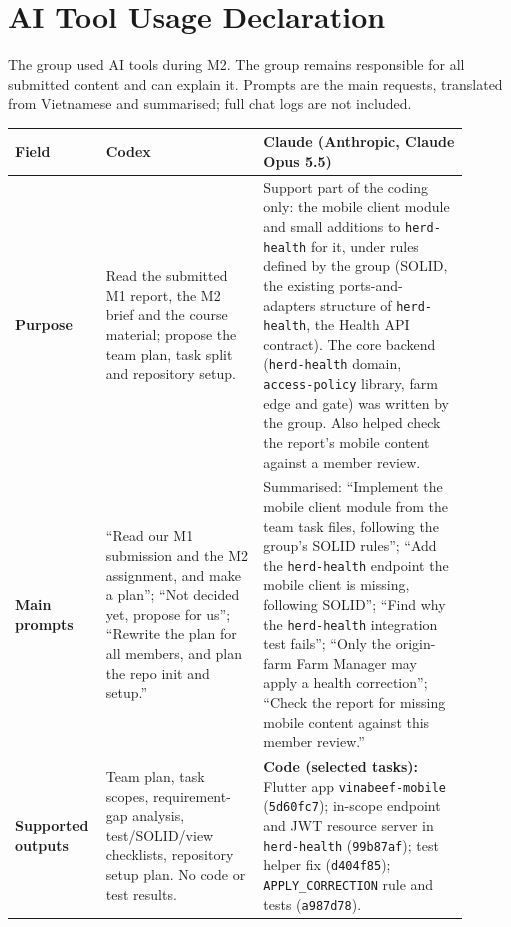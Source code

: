 \section{AI Tool Usage Declaration}\label{app:B}

The group used AI tools during M2. The group remains responsible for
all submitted content and can explain it. Prompts are the main
requests, translated from Vietnamese and summarised; full chat logs
are not included.

{\small
\begin{longtable}{|>{\raggedright\arraybackslash}p{0.14\linewidth}|>{\raggedright\arraybackslash}p{0.33\linewidth}|>{\raggedright\arraybackslash}p{0.43\linewidth}|}
\hline
\textbf{Field} & \textbf{Codex} & \textbf{Claude (Anthropic, Claude Opus 5.5)} \\ \hline
\endhead
\textbf{Purpose} &
Read the submitted M1 report, the M2 brief and the course material;
propose the team plan, task split and repository setup. &
Support part of the coding only: the mobile client module and small
additions to \texttt{herd-health} for it, under rules defined by the
group (SOLID, the existing ports-and-adapters structure of
\texttt{herd-health}, the Health API contract). The core backend
(\texttt{herd-health} domain, \texttt{access-policy} library, farm edge
and gate) was written by the group. Also helped check the report's
mobile content against a member review. \\ \hline
\textbf{Main prompts} &
``Read our M1 submission and the M2 assignment, and make a plan'';
``Not decided yet, propose for us''; ``Rewrite the plan for all
members, and plan the repo init and setup.'' &
Summarised: ``Implement the mobile client module from the team task
files, following the group's SOLID rules''; ``Add the
\texttt{herd-health} endpoint the mobile client is missing, following
SOLID''; ``Find why the \texttt{herd-health} integration test fails'';
``Only the origin-farm Farm Manager may apply a health correction'';
``Check the report for missing mobile content against this member
review.'' \\ \hline
\textbf{Supported outputs} &
Team plan, task scopes, requirement-gap analysis, test/SOLID/view
checklists, repository setup plan. No code or test results. &
\textbf{Code (selected tasks):} Flutter app \texttt{vinabeef-mobile}
(\texttt{5d60fc7}); in-scope endpoint and JWT resource server in
\texttt{herd-health} (\texttt{99b87af}); test helper fix
(\texttt{d404f85}); \texttt{APPLY\_CORRECTION} rule and tests
(\texttt{a987d78}).\newline

\end{longtable}}
